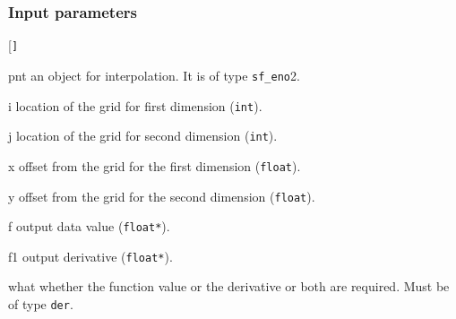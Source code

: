 \subsubsection*{Input parameters}
\begin{desclist}{\tt }{\quad}[\tt ]
   \setlength\itemsep{0pt}
   \item[pnt]  an object for interpolation. It is of type \texttt{sf\_eno}2.
   \item[i]    location of the grid for first dimension (\texttt{int}).
   \item[j]    location of the grid for second dimension (\texttt{int}).
   \item[x]    offset from the grid for the first dimension (\texttt{float}).  
   \item[y]    offset from the grid for the second dimension (\texttt{float}).  
   \item[f]    output data value (\texttt{float*}).  
   \item[f1]   output derivative (\texttt{float*}).  
   \item[what] whether the function value or the derivative or both are required. Must be of type \texttt{der}.  
\end{desclist}


